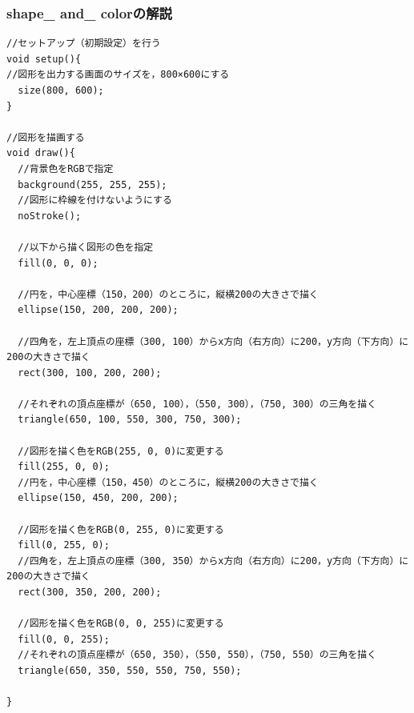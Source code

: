 \documentclass[a4j]{jarticle}
\begin{document}
\subsubsection{shape\_ and\_ colorの解説}
\begin{screen}
\begin{verbatim}
//セットアップ（初期設定）を行う
void setup(){
//図形を出力する画面のサイズを，800×600にする
  size(800, 600); 
}

//図形を描画する
void draw(){
  //背景色をRGBで指定
  background(255, 255, 255);
  //図形に枠線を付けないようにする
  noStroke();
  
  //以下から描く図形の色を指定
  fill(0, 0, 0);
  
  //円を，中心座標（150，200）のところに，縦横200の大きさで描く
  ellipse(150, 200, 200, 200);
  
  //四角を，左上頂点の座標（300, 100）からx方向（右方向）に200，y方向（下方向）に200の大きさで描く
  rect(300, 100, 200, 200);

  //それぞれの頂点座標が（650, 100），（550, 300），（750, 300）の三角を描く
  triangle(650, 100, 550, 300, 750, 300);
  
  //図形を描く色をRGB(255, 0, 0)に変更する
  fill(255, 0, 0);
  //円を，中心座標（150，450）のところに，縦横200の大きさで描く
  ellipse(150, 450, 200, 200);
  
  //図形を描く色をRGB(0, 255, 0)に変更する
  fill(0, 255, 0);
  //四角を，左上頂点の座標（300, 350）からx方向（右方向）に200，y方向（下方向）に200の大きさで描く
  rect(300, 350, 200, 200);
  
  //図形を描く色をRGB(0, 0, 255)に変更する
  fill(0, 0, 255);
  //それぞれの頂点座標が（650, 350），（550, 550），（750, 550）の三角を描く
  triangle(650, 350, 550, 550, 750, 550);
  
}
\end{verbatim}
\end{screen}
\end{document}
